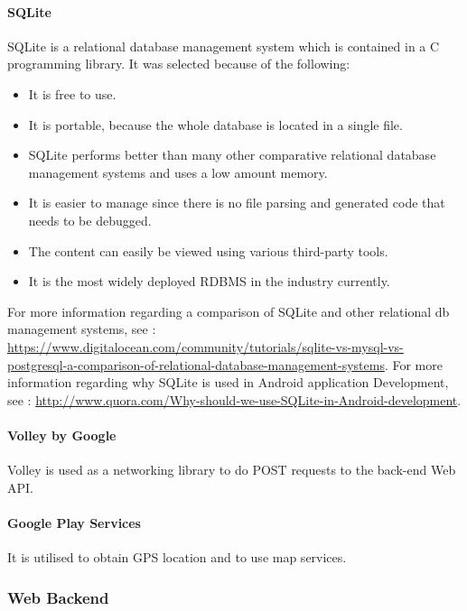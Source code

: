 \documentclass[11pt,a4paper,titlepage]{article}
\begin{document}
			\paragraph{SQLite}
				SQLite is a relational database management system which is contained in a C programming library. It was selected because of the following: 
					\begin{itemize}	
						\item It is free to use. 
						\item It is portable, because the whole database is located in a single file.
						\item SQLite performs better than many other comparative relational database management systems and uses a low amount memory.
						\item It is easier to manage since there is no file parsing and generated code that needs to be debugged. 
						\item The content can easily be viewed using various third-party tools.
						\item It is the most widely deployed RDBMS in the industry currently.
						
					\end{itemize}
For more information regarding a comparison of SQLite and other relational db management systems, see :  \url{https://www.digitalocean.com/community/tutorials/sqlite-vs-mysql-vs-postgresql-a-comparison-of-relational-database-management-systems}. \newline
For more information regarding why SQLite is used in Android application Development, see :  \url{http://www.quora.com/Why-should-we-use-SQLite-in-Android-development}. 
		\paragraph{Volley by Google}
		Volley is used as a networking library to do POST requests to the back-end Web API.
		\paragraph{Google Play Services}
		It is utilised to obtain GPS location and to use map services.

		\subsubsection{Web Backend}
\end{document}
